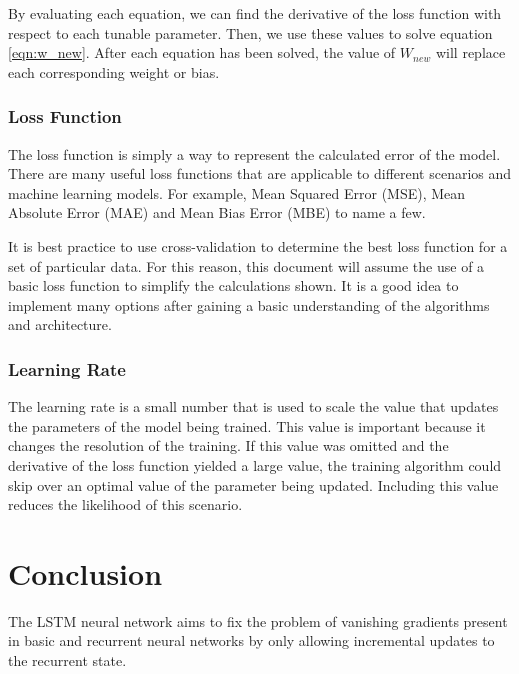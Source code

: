 \documentclass[12pt]{article}
\begin{document}
By evaluating each equation, we can find the derivative of the loss function
with respect to each tunable parameter. Then, we use these values to solve
equation \ref{eqn:w_new}. After each equation has been solved, the value of
$W_{new}$ will replace each corresponding weight or bias.

\subsubsection{Loss Function}

The loss function is simply a way to represent the calculated error of the
model. There are many useful loss functions that are applicable to different
scenarios and machine learning models. For example, Mean Squared Error (MSE),
Mean Absolute Error (MAE) and Mean Bias Error (MBE) to name a few.

It is best practice to use cross-validation to determine the best loss function
for a set of particular data. For this reason, this document will assume the
use of a basic loss function to simplify the calculations shown. It is a good
idea to implement many options after gaining a basic understanding of the
algorithms and architecture.

\subsubsection{Learning Rate}

The learning rate is a small number that is used to scale the value that
updates the parameters of the model being trained. This value is important
because it changes the resolution of the training. If this value was omitted
and the derivative of the loss function yielded a large value, the training
algorithm could skip over an optimal value of the parameter being updated.
Including this value reduces the likelihood of this scenario.

\section{Conclusion}
The LSTM neural network aims to fix the problem of vanishing gradients present
in basic and recurrent neural networks by only allowing incremental updates to
the recurrent state.
\end{document}
